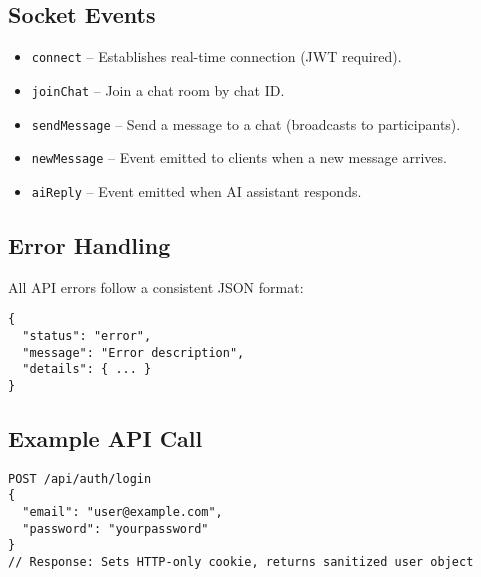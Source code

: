 \documentclass[12pt]{article}
\begin{document}
\subsection{Socket Events}
\begin{itemize}[leftmargin=1cm]
    \item \texttt{connect} -- Establishes real-time connection (JWT required).
    \item \texttt{joinChat} -- Join a chat room by chat ID.
    \item \texttt{sendMessage} -- Send a message to a chat (broadcasts to participants).
    \item \texttt{newMessage} -- Event emitted to clients when a new message arrives.
    \item \texttt{aiReply} -- Event emitted when AI assistant responds.
\end{itemize}

\subsection{Error Handling}
All API errors follow a consistent JSON format:
\begin{verbatim}
{
  "status": "error",
  "message": "Error description",
  "details": { ... }
}
\end{verbatim}

\subsection{Example API Call}
\begin{verbatim}
POST /api/auth/login
{
  "email": "user@example.com",
  "password": "yourpassword"
}
// Response: Sets HTTP-only cookie, returns sanitized user object
\end{verbatim}
\end{document}
